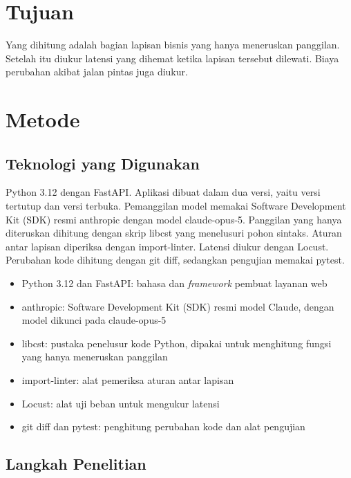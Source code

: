 \documentclass[11pt,a4paper]{article}
\begin{document}
\section{Tujuan}

Yang dihitung adalah bagian lapisan bisnis yang hanya meneruskan panggilan. Setelah itu diukur latensi yang dihemat ketika lapisan tersebut dilewati. Biaya perubahan akibat jalan pintas juga diukur.

\section{Metode}

\subsection{Teknologi yang Digunakan}

Python 3.12 dengan FastAPI. Aplikasi dibuat dalam dua versi, yaitu versi tertutup dan versi terbuka. Pemanggilan model memakai Software Development Kit (SDK) resmi anthropic dengan model claude-opus-5. Panggilan yang hanya diteruskan dihitung dengan skrip libcst yang menelusuri pohon sintaks. Aturan antar lapisan diperiksa dengan import-linter. Latensi diukur dengan Locust. Perubahan kode dihitung dengan git diff, sedangkan pengujian memakai pytest.

\begin{itemize}[leftmargin=*]
  \item Python 3.12 dan FastAPI: bahasa dan \textit{framework} pembuat layanan web
  \item anthropic: Software Development Kit (SDK) resmi model Claude, dengan model dikunci pada claude-opus-5
  \item libcst: pustaka penelusur kode Python, dipakai untuk menghitung fungsi yang hanya meneruskan panggilan
  \item import-linter: alat pemeriksa aturan antar lapisan
  \item Locust: alat uji beban untuk mengukur latensi
  \item git diff dan pytest: penghitung perubahan kode dan alat pengujian
\end{itemize}

\subsection{Langkah Penelitian}
\end{document}
